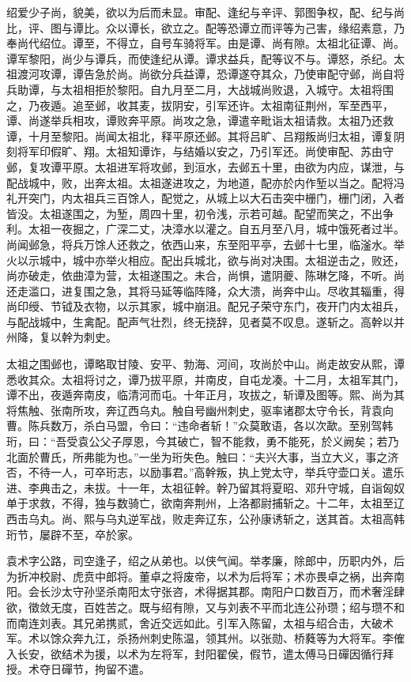 \documentclass[12pt,UTF8]{ctexbook}
\begin{document}
绍爱少子尚，貌美，欲以为后而未显。审配、逢纪与辛评、郭图争权，配、纪与尚比，评、图与谭比。众以谭长，欲立之。配等恐谭立而评等为己害，缘绍素意，乃奉尚代绍位。谭至，不得立，自号车骑将军。由是谭、尚有隙。太祖北征谭、尚。谭军黎阳，尚少与谭兵，而使逢纪从谭。谭求益兵，配等议不与。谭怒，杀纪。太祖渡河攻谭，谭告急於尚。尚欲分兵益谭，恐谭遂夺其众，乃使审配守邺，尚自将兵助谭，与太祖相拒於黎阳。自九月至二月，大战城尚败退，入城守。太祖将围之，乃夜遁。追至邺，收其麦，拔阴安，引军还许。太祖南征荆州，军至西平，谭、尚遂举兵相攻，谭败奔平原。尚攻之急，谭遣辛毗诣太祖请救。太祖乃还救谭，十月至黎阳。尚闻太祖北，释平原还邺。其将吕旷、吕翔叛尚归太祖，谭复阴刻将军印假旷、翔。太祖知谭诈，与结婚以安之，乃引军还。尚使审配、苏由守邺，复攻谭平原。太祖进军将攻邺，到洹水，去邺五十里，由欲为内应，谋泄，与配战城中，败，出奔太祖。太祖遂进攻之，为地道，配亦於内作堑以当之。配将冯礼开突门，内太祖兵三百馀人，配觉之，从城上以大石击突中栅门，栅门闭，入者皆没。太祖遂围之，为堑，周四十里，初令浅，示若可越。配望而笑之，不出争利。太祖一夜掘之，广深二丈，决漳水以灌之。自五月至八月，城中饿死者过半。尚闻邺急，将兵万馀人还救之，依西山来，东至阳平亭，去邺十七里，临滏水。举火以示城中，城中亦举火相应。配出兵城北，欲与尚对决围。太祖逆击之，败还，尚亦破走，依曲漳为营，太祖遂围之。未合，尚惧，遣阴夔、陈琳乞降，不听。尚还走滥口，进复围之急，其将马延等临阵降，众大溃，尚奔中山。尽收其辎重，得尚印绶、节钺及衣物，以示其家，城中崩沮。配兄子荣守东门，夜开门内太祖兵，与配战城中，生禽配。配声气壮烈，终无挠辞，见者莫不叹息。遂斩之。高幹以并州降，复以幹为刺史。

太祖之围邺也，谭略取甘陵、安平、勃海、河间，攻尚於中山。尚走故安从熙，谭悉收其众。太祖将讨之，谭乃拔平原，并南皮，自屯龙凑。十二月，太祖军其门，谭不出，夜遁奔南皮，临清河而屯。十年正月，攻拔之，斩谭及图等。熙、尚为其将焦触、张南所攻，奔辽西乌丸。触自号幽州刺史，驱率诸郡太守令长，背袁向曹。陈兵数万，杀白马盟，令曰：“违命者斩！”众莫敢语，各以次歃。至别驾韩珩，曰：“吾受袁公父子厚恩，今其破亡，智不能救，勇不能死，於义阙矣；若乃北面於曹氏，所弗能为也。”一坐为珩失色。触曰：“夫兴大事，当立大义，事之济否，不待一人，可卒珩志，以励事君。”高幹叛，执上党太守，举兵守壶口关。遣乐进、李典击之，未拔。十一年，太祖征幹。幹乃留其将夏昭、邓升守城，自诣匈奴单于求救，不得，独与数骑亡，欲南奔荆州，上洛都尉捕斩之。十二年，太祖至辽西击乌丸。尚、熙与乌丸逆军战，败走奔辽东，公孙康诱斩之，送其首。太祖高韩珩节，屡辟不至，卒於家。

袁术字公路，司空逢子，绍之从弟也。以侠气闻。举孝廉，除郎中，历职内外，后为折冲校尉、虎贲中郎将。董卓之将废帝，以术为后将军；术亦畏卓之祸，出奔南阳。会长沙太守孙坚杀南阳太守张咨，术得据其郡。南阳户口数百万，而术奢淫肆欲，徵敛无度，百姓苦之。既与绍有隙，又与刘表不平而北连公孙瓒；绍与瓒不和而南连刘表。其兄弟携贰，舍近交远如此。引军入陈留，太祖与绍合击，大破术军。术以馀众奔九江，杀扬州刺史陈温，领其州。以张勋、桥蕤等为大将军。李傕入长安，欲结术为援，以术为左将军，封阳翟侯，假节，遣太傅马日磾因循行拜授。术夺日磾节，拘留不遣。
\end{document}
